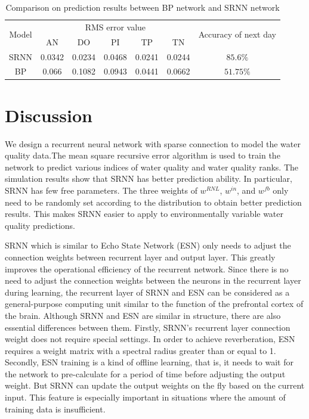 \documentclass[runningheads]{llncs}
\begin{document}
\begin{table}[htbp] 
\centering
\caption{Comparison on prediction results between BP network and SRNN network}
\label{Comparison on prediction results between BP network and SRNN network}
\begin{tabular}{ccccccc} 
\toprule 
\multirow{2}{*}{Model}&\multicolumn{5}{c}{RMS error value}&\multirow{2}{4.25cm}{Accuracy of next day}\\
\cline{2-6}
&AN &DO&PI&TP&TN&\\
\midrule 
SRNN&0.0342&0.0234&0.0468&0.0241&0.0244&$85.6\%$\\
BP&0.066&0.1082&0.0943&0.0441&0.0662&$51.75\%$\\
\bottomrule 
\end{tabular} 
\end{table}

\section{Discussion}
We design a recurrent neural network with sparse connection to model 
the water quality data.The mean square recursive error algorithm 
is used to train the network to predict various indices of water quality 
and water quality ranks. The simulation results show that SRNN has better 
prediction ability. In particular, SRNN has few free parameters. The three 
weights of $w^{RNL}$, $w^{in}$, and $w^{fb}$ only need to be randomly set 
according to the distribution to obtain better prediction results.
This makes SRNN easier to apply to environmentally variable water 
quality predictions.

SRNN which is similar to Echo State Network (ESN) only needs 
to adjust the connection weights between recurrent layer and output layer. 
This greatly improves the operational efficiency of the recurrent network. 
Since there is no need to adjust the connection weights between the neurons 
in the recurrent layer during learning, the recurrent layer of SRNN 
and ESN can be considered as a general-purpose computing unit similar
to the function of the prefrontal cortex of the brain\cite{RN20,RN21}. 
Although SRNN and ESN are similar in structure, there are also essential 
differences between them. Firstly, SRNN's recurrent layer connection 
weight does not require special settings. In order to achieve 
reverberation, ESN requires a weight matrix with a spectral radius 
greater than or equal to 1. Secondly, ESN training is a kind of 
offline learning, that is, it needs to wait for the network to 
pre-calculate for a period of time before adjusting the output 
weight. But SRNN can update the output weights on the fly based 
on the current input. This feature is especially important 
in situations where the amount of training data is insufficient. 
\end{document}
